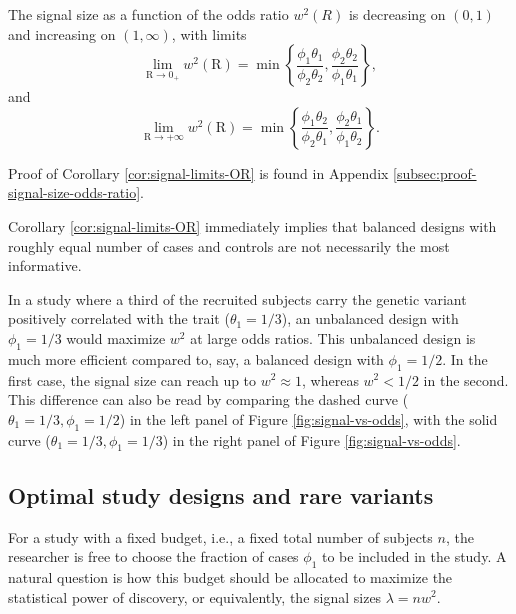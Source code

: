 \begin{corollary} \label{cor:signal-limits-OR}
The signal size as a function of the odds ratio $w^2(R)$ is decreasing on $(0,1)$ and increasing on $(1,\infty)$, with limits
\begin{equation} \label{eq:signal-size-upper-bound-1}
    \lim_{\text{R}\to0_+} w^2(\text{R}) = \min\left\{\frac{\phi_1\theta_1}{\phi_2\theta_2}, \frac{\phi_2\theta_2}{\phi_1\theta_1}\right\},
\end{equation}
and
\begin{equation} \label{eq:signal-size-upper-bound-2}
    \lim_{\text{R}\to+\infty} w^2(\text{R}) = \min\left\{\frac{\phi_1\theta_2}{\phi_2\theta_1}, \frac{\phi_2\theta_1}{\phi_1\theta_2}\right\}.
\end{equation}
\end{corollary}
Proof of Corollary \ref{cor:signal-limits-OR} is found in Appendix \ref{subsec:proof-signal-size-odds-ratio}. 

Corollary \ref{cor:signal-limits-OR} immediately implies that balanced designs with roughly equal number of cases and controls are not necessarily the most informative.

\begin{example}
In a study where a third of the recruited subjects carry the genetic variant positively correlated with the trait ($\theta_1=1/3$), an unbalanced design with $\phi_1=1/3$ would maximize $w^2$ at large odds ratios.
This unbalanced design is much more efficient compared to, say, a balanced design with $\phi_1=1/2$.
In the first case, the signal size can reach up to $w^2\approx1$, whereas  $w^2<1/2$ in the second.
This difference can also be read by comparing the dashed curve ($\theta_1=1/3,\phi_1=1/2$) in the left panel of Figure \ref{fig:signal-vs-odds}, with the solid curve ($\theta_1=1/3,\phi_1=1/3$) in the right panel of Figure \ref{fig:signal-vs-odds}.
\end{example}

\subsection{Optimal study designs and rare variants}
\label{subsec:optimal-design} 

For a study with a fixed budget, i.e., a fixed total number of subjects $n$, the researcher is free to choose the fraction of cases $\phi_1$ to be included in the study.
A natural question is how this budget should be allocated to maximize the statistical power of discovery, or equivalently, the signal sizes $\lambda=nw^2$.

